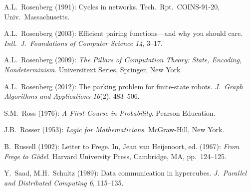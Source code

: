 \begin{thebibliography}{999}



A.L.~Rosenberg (1991): Cycles in networks.  Tech.~Rpt.~COINS-91-20, Univ.~Massachusetts.


A.L.~Rosenberg (2003): Efficient pairing functions---and why you should care.  {\it Intl.~J.~Foundations of Computer Science 14}, 3--17.

A.L.~Rosenberg (2009):
{\it The Pillars of Computation Theory: State, Encoding, Nondeterminism}.
Universitext Series, Springer, New York 

A.L.~Rosenberg (2012): The parking problem for finite-state robots.  {\it J.~Graph Algorithms and Applications 16}(2), 483--506.




S.M.~Ross (1976):
{\it A First Course in Probability}.
Pearson Education.

J.B.~Rosser (1953):
{\it Logic for Mathematicians.}
McGraw-Hill, New York.

B.~Russell (1902): Letter to Frege.  In, Jean van Heijenoort,
ed. (1967):  {\it From Frege to G\"{o}del}.  Harvard University
Press, Cambridge, MA, pp.~124--125.


Y.~Saad, M.H.~Schultz (1989):
Data communication in hypercubes.
{\it J.~Parallel and Distributed Computing 6}, 115--135.


\end{thebibliography}
